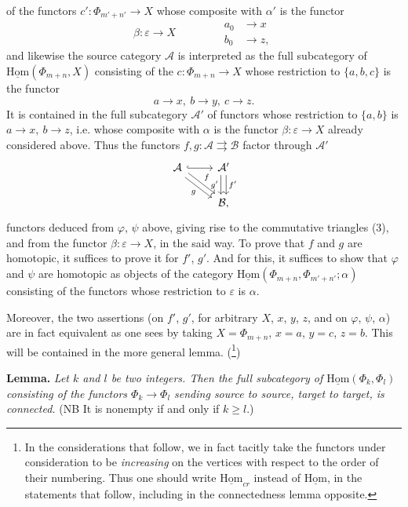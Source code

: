 \documentclass[11pt]{article}
\newcommand{\printedpage}[1]{\marginpar{\footnotesize p.~#1}}
\newcommand{\msp}[1]{\marginpar{\footnotesize [#1]}}
\newcommand{\uHom}{\underline{\mathrm{Hom}}}
\begin{document}
\msp{page 16}
of the functors $c':\Phi_{m'+n'}\longrightarrow X$ whose composite with $\alpha'$ is the functor
\[
\beta:\varepsilon\longrightarrow X\qquad\qquad
\begin{aligned}
a_0&\longrightarrow x\\
b_0&\longrightarrow z,
\end{aligned} \tag*{$(*)$}
\]
and likewise the source category $\mathcal{A}$ is interpreted as the full subcategory of $\uHom(\Phi_{m+n},X)$ consisting of the $c:\Phi_{m+n}\longrightarrow X$ whose restriction to $\{a,b,c\}$ is the functor
\[
a\longrightarrow x,\ b\longrightarrow y,\ c\longrightarrow z.
\]
 It is contained in the full subcategory $\mathcal{A}'$ of functors whose restriction to $\{a,b\}$ is $a\longrightarrow x,\ b\longrightarrow z$, i.e. whose composite with $\alpha$ is the functor $\beta:\varepsilon\longrightarrow X$ already considered above. Thus the functors $f,g:\mathcal{A}\rightrightarrows\mathcal{B}$ factor through $\mathcal{A}'$
\printedpage{11}
\[
\begin{tikzcd}
\mathcal{A} \arrow[r,hook] \arrow[dr,shift left,"f"] \arrow[dr,shift right,"g"'] & \mathcal{A}' \arrow[d,shift right,"g'"'] \arrow[d,shift left,"f'"] \\
 & \mathcal{B},
\end{tikzcd}
\]
functors deduced from $\varphi$, $\psi$ above, giving rise to the commutative triangles (3), and from the functor $\beta:\varepsilon\longrightarrow X$, in the said way. To prove that $f$ and $g$ are homotopic, it suffices to prove it for $f'$, $g'$. And for this, it suffices to show that $\varphi$ and $\psi$ are homotopic as objects of the category $\uHom(\Phi_{m+n},\Phi_{m'+n'};\alpha)$ consisting of the functors whose restriction to $\varepsilon$ is $\alpha$.

\msp{page 17}
Moreover, the two assertions (on $f'$, $g'$, for arbitrary $X$, $x$, $y$, $z$, and on $\varphi$, $\psi$, $\alpha$) are in fact equivalent as one sees by taking $X=\Phi_{m+n}$, $x=a$, $y=c$, $z=b$. This will be contained in the more general lemma. (\footnote[4]{In the considerations that follow, we in fact tacitly take the functors under consideration to be \textit{increasing} on the vertices with respect to the order of their numbering. Thus one should write $\uHom_{cr}$ instead of $\uHom$, in the statements that follow, including in the connectedness lemma opposite.})

\textbf{Lemma.} \textit{Let $k$ and $l$ be two integers. Then the full subcategory of $\uHom(\Phi_k,\Phi_l)$ consisting of the functors $\Phi_k\longrightarrow\Phi_l$ sending source to source, target to target, is connected.} (NB It is nonempty if and only if $k\geq l$.)
\end{document}
